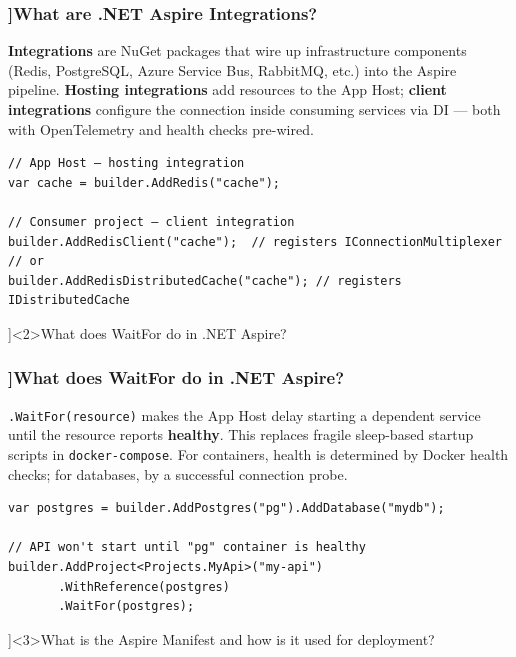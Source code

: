 \begin{frame}[fragile]
  \frametitle{\AnswerTitle[\CategoryBadge[AspireColor!20]{.NET Aspire}]{What are .NET Aspire Integrations?}}

  {\footnotesize
  \textbf{Integrations} are NuGet packages that wire up infrastructure components (Redis, PostgreSQL, Azure Service Bus, RabbitMQ, etc.) into the Aspire pipeline. \textbf{Hosting integrations} add resources to the App Host; \textbf{client integrations} configure the connection inside consuming services via DI — both with OpenTelemetry and health checks pre-wired.
  }

  \begin{verbatim}
// App Host – hosting integration
var cache = builder.AddRedis("cache");

// Consumer project – client integration
builder.AddRedisClient("cache");  // registers IConnectionMultiplexer
// or
builder.AddRedisDistributedCache("cache"); // registers IDistributedCache
  \end{verbatim}
\end{frame}

\QuestionSlide[\CategoryBadge[AspireColor!20]{.NET Aspire}]<2>{What does WaitFor do in .NET Aspire?}

\begin{frame}[fragile]
  \frametitle{\AnswerTitle[\CategoryBadge[AspireColor!20]{.NET Aspire}]{What does WaitFor do in .NET Aspire?}}

  {\footnotesize
  \texttt{.WaitFor(resource)} makes the App Host delay starting a dependent service until the resource reports \textbf{healthy}. This replaces fragile sleep-based startup scripts in \texttt{docker-compose}. For containers, health is determined by Docker health checks; for databases, by a successful connection probe.
  }

  \begin{verbatim}
var postgres = builder.AddPostgres("pg").AddDatabase("mydb");

// API won't start until "pg" container is healthy
builder.AddProject<Projects.MyApi>("my-api")
       .WithReference(postgres)
       .WaitFor(postgres);
  \end{verbatim}
\end{frame}

\QuestionSlide[\CategoryBadge[AspireColor!20]{.NET Aspire}]<3>{What is the Aspire Manifest and how is it used for deployment?}

